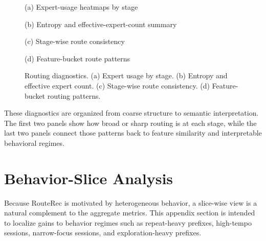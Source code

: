 \documentclass[sigconf,review,anonymous]{acmart}
\newcommand{\placeholderpanel}[1]{\fbox{\rule{0pt}{#1}\rule{0.92\linewidth}{0pt}}}
\begin{document}
\begin{figure}[t]
  \centering
  \begin{minipage}[t]{0.48\linewidth}
    \centering
    \placeholderpanel{1.18in}

    \vspace{0.35em}
    {\footnotesize (a) Expert-usage heatmaps by stage}
  \end{minipage}\hfill
  \begin{minipage}[t]{0.48\linewidth}
    \centering
    \placeholderpanel{1.18in}

    \vspace{0.35em}
    {\footnotesize (b) Entropy and effective-expert-count summary}
  \end{minipage}

  \vspace{0.8em}

  \begin{minipage}[t]{0.48\linewidth}
    \centering
    \placeholderpanel{1.18in}

    \vspace{0.35em}
    {\footnotesize (c) Stage-wise route consistency}
  \end{minipage}\hfill
  \begin{minipage}[t]{0.48\linewidth}
    \centering
    \placeholderpanel{1.18in}

    \vspace{0.35em}
    {\footnotesize (d) Feature-bucket route patterns}
  \end{minipage}
  \caption{Routing diagnostics. (a) Expert usage by stage. (b) Entropy and effective expert count. (c) Stage-wise route consistency. (d) Feature-bucket routing patterns.}
  \label{fig:appendix-diagnostics}
\end{figure}

These diagnostics are organized from coarse structure to semantic interpretation. The first two panels show how broad or sharp routing is at each stage, while the last two panels connect those patterns back to feature similarity and interpretable behavioral regimes.

\section{Behavior-Slice Analysis}
\label{app:behavior-slices}
Because RouteRec is motivated by heterogeneous behavior, a slice-wise view is a natural complement to the aggregate metrics. This appendix section is intended to localize gains to behavior regimes such as repeat-heavy prefixes, high-tempo sessions, narrow-focus sessions, and exploration-heavy prefixes.
\end{document}
